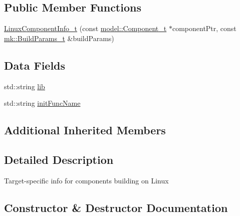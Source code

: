 \subsection*{Public Member Functions}
\begin{DoxyCompactItemize}
\item 
\hyperlink{classtarget_1_1_linux_component_info__t_a7ba33966f535c134c4f59a5daa0ffbb7}{Linux\+Component\+Info\+\_\+t} (const \hyperlink{structmodel_1_1_component__t}{model\+::\+Component\+\_\+t} $\ast$component\+Ptr, const \hyperlink{structmk_1_1_build_params__t}{mk\+::\+Build\+Params\+\_\+t} \&build\+Params)
\end{DoxyCompactItemize}
\subsection*{Data Fields}
\begin{DoxyCompactItemize}
\item 
std\+::string \hyperlink{classtarget_1_1_linux_component_info__t_ae9ddd7b1eb6acf23ad7aacfc21dab793}{lib}
\item 
std\+::string \hyperlink{classtarget_1_1_linux_component_info__t_a780fc560a3640933b0ab7e2978b181d5}{init\+Func\+Name}
\end{DoxyCompactItemize}
\subsection*{Additional Inherited Members}


\subsection{Detailed Description}
Target-\/specific info for components building on Linux 

\subsection{Constructor \& Destructor Documentation}
